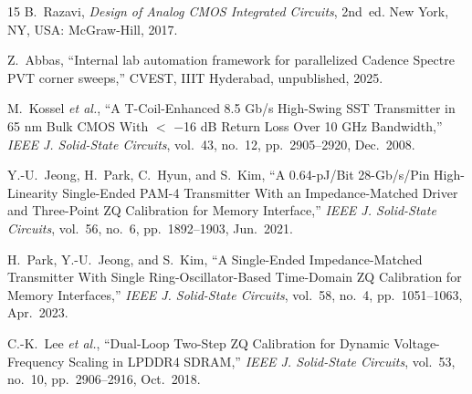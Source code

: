 \documentclass[lettersize,journal]{IEEEtran}
\begin{document}
\begin{thebibliography}{15}
B.~Razavi, \textit{Design of Analog CMOS Integrated Circuits}, 2nd~ed. New York, NY, USA: McGraw-Hill, 2017.

Z.~Abbas, ``Internal lab automation framework for parallelized Cadence Spectre PVT corner sweeps,'' CVEST, IIIT Hyderabad, unpublished, 2025.

M.~Kossel \textit{et al.}, ``A T-Coil-Enhanced 8.5 Gb/s High-Swing SST Transmitter in 65 nm Bulk CMOS With $<$ $-$16 dB Return Loss Over 10 GHz Bandwidth,'' \textit{IEEE J. Solid-State Circuits}, vol.~43, no.~12, pp.~2905--2920, Dec.~2008.

Y.-U.~Jeong, H.~Park, C.~Hyun, and S.~Kim, ``A 0.64-pJ/Bit 28-Gb/s/Pin High-Linearity Single-Ended PAM-4 Transmitter With an Impedance-Matched Driver and Three-Point ZQ Calibration for Memory Interface,'' \textit{IEEE J. Solid-State Circuits}, vol.~56, no.~6, pp.~1892--1903, Jun.~2021.

H.~Park, Y.-U.~Jeong, and S.~Kim, ``A Single-Ended Impedance-Matched Transmitter With Single Ring-Oscillator-Based Time-Domain ZQ Calibration for Memory Interfaces,'' \textit{IEEE J. Solid-State Circuits}, vol.~58, no.~4, pp.~1051--1063, Apr.~2023.

C.-K.~Lee \textit{et al.}, ``Dual-Loop Two-Step ZQ Calibration for Dynamic Voltage-Frequency Scaling in LPDDR4 SDRAM,'' \textit{IEEE J. Solid-State Circuits}, vol.~53, no.~10, pp.~2906--2916, Oct.~2018.

\end{thebibliography}


\vfill
\end{document}
